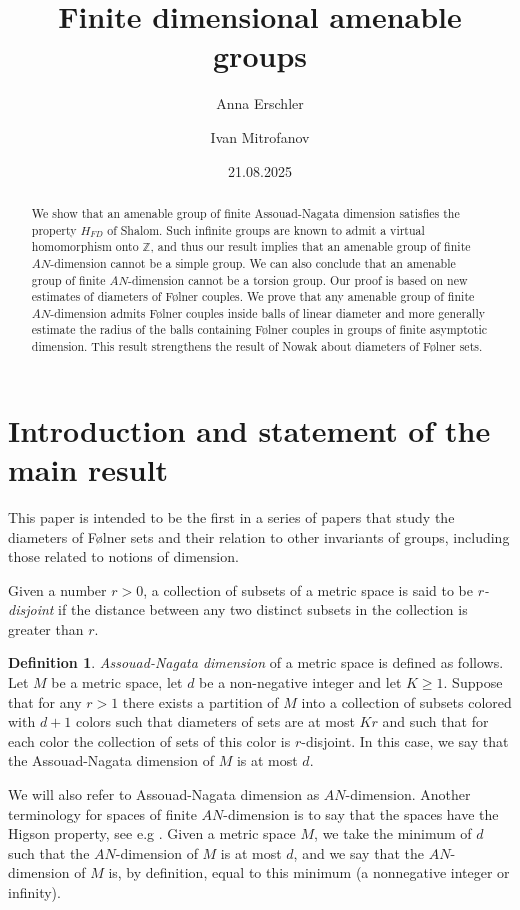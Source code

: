 \documentclass{amsart}
\author{Anna Erschler}
\author{Ivan Mitrofanov}
\title{Finite dimensional amenable groups}
\date{21.08.2025}
\numberwithin{figure}{section}
\theoremstyle{plain}
\theoremstyle{definition}
\newtheorem{definition}[thm]{Definition}
\begin{document}
\begin{abstract}
We show that an amenable group of finite Assouad-Nagata dimension satisfies
the property $H_{FD}$ of Shalom. Such infinite groups are known to admit a virtual homomorphism onto $\mathbb{Z}$, and thus our result implies that an amenable group of finite $AN$-dimension cannot be a simple group. We can also conclude that an amenable group of finite $AN$-dimension cannot be a torsion group.
Our proof is based on new estimates of diameters of F{\o}lner couples.
 We  prove that any amenable group of finite $AN$-dimension  admits F{\o}lner couples inside balls of linear diameter and more generally estimate the radius of the balls containing F{\o}lner couples in groups of finite asymptotic dimension.
 This result strengthens the result of Nowak about diameters of F{\o}lner sets.
\end{abstract}
\maketitle


\section{Introduction and statement of the main result}

This paper is intended to be the first in a series of papers that study the diameters  of F{\o}lner sets and their relation to other invariants of groups, including those related to notions of dimension.

Given a number $r>0$, a collection of subsets of a metric space is said to be {\it $r$-disjoint} if the distance between any two distinct subsets in the collection is greater than $r$. 

\begin{definition} \label{def:nagata} {\it Assouad-Nagata dimension} of a metric space is defined as follows. 
Let $M$ be a metric space, let  $d$  be a non-negative integer and let $K\geqslant 1$.
Suppose that for any $r>1$ there exists a partition of $M$ into a collection of subsets colored with $d+1$ colors such that diameters of sets are at most  $K r$ and such that for each color the collection of sets of this color is $r$-disjoint.
In this case, 
we say that the Assouad-Nagata dimension
of $M$ is at most $d$. 
	\end{definition}
We will also refer to  Assouad-Nagata dimension as $AN$-dimension.  Another terminology for spaces of finite $AN$-dimension is to say that the spaces have the Higson
property, see e.g \cite{nowak}.
Given a metric space $M$, we take the minimum of $d$ such that the $AN$-dimension of $M$ is at most $d$, and we say that the $AN$-dimension of $M$ is, by definition, equal to this minimum (a nonnegative integer or infinity).
\end{document}
